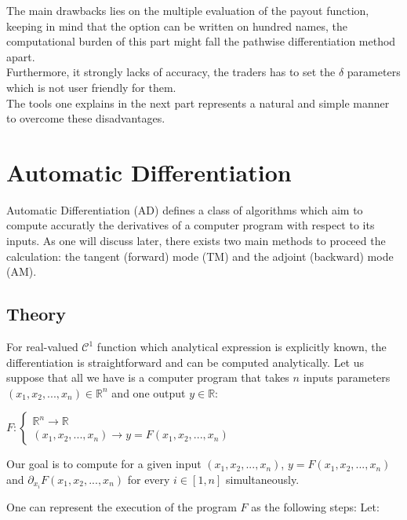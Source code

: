 \documentclass {article}
\begin{document}
		The main drawbacks lies on the multiple evaluation of the payout function, keeping in mind that the option can be written on 
		hundred names, the computational burden of this part might fall the pathwise differentiation method apart. \\
		Furthermore, it strongly lacks of accuracy, the traders has to set the $\delta$ parameters which is not user friendly for them. \\
		The tools one explains in the next part represents a natural and simple manner to overcome these disadvantages.
		
	\section{Automatic Differentiation}
	
		Automatic Differentiation (AD) defines a class of algorithms which aim to compute accuratly the derivatives of a computer 
		program with respect to its inputs. As one will discuss later, there exists two main methods to proceed the calculation: the 
		tangent (forward) mode (TM) and the adjoint (backward) mode (AM).
		
		\subsection{Theory}
			
			For real-valued $\mathcal{C}^{1}$ function which analytical expression is explicitly known, the differentiation is 
			straightforward and can be computed analytically. Let us suppose that all we have is a computer program that takes $n$ 
			inputs parameters $(x_{1}, x_{2}, ...,  x_{n}) \in \mathbb{R}^{n}$ and one output $y \in \mathbb{R}$:
			
			\begin{center}
				$F :  \begin{cases} \mathbb{R}^{n} \longrightarrow \mathbb{R} \\ (x_{1}, x_{2}, ...,  x_{n}) \longrightarrow y = F (x_{1}, x_{2}, ...,  x_{n}) \end{cases}$
			\end{center}
		
			Our goal is to compute for a given input $(x_{1}, x_{2}, ...,  x_{n})$, $y = F (x_{1}, x_{2}, ...,  x_{n})$ and $\partial_{x_{i}}F (x_{1}, x_{2}, ...,  x_{n})$ 
			for every $i \in \left[ 1, n \right]$ simultaneously.
			
			One can represent the execution of the program $F$ as the following steps:
			Let:
			
\end{document}

